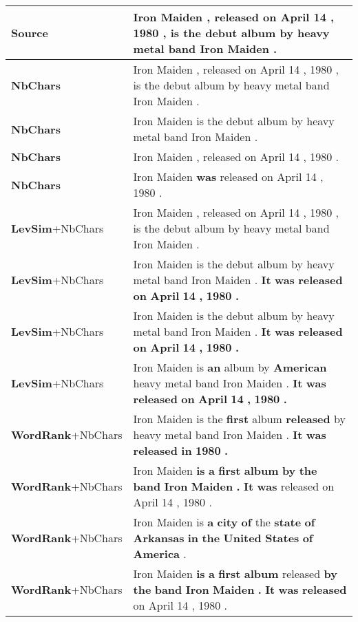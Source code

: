 \documentclass[10pt, a4paper]{article}
\begin{document}
\begin{table*}
{\begin{tabular}{ll}
\textbf{Source} & Iron Maiden , released on April 14 , 1980 , is the debut album by heavy metal band Iron Maiden . \\
\midrule
\textbf{NbChars} & Iron Maiden , released on April 14 , 1980 , is the debut album by heavy metal band Iron Maiden . \\
\textbf{NbChars} & Iron Maiden is the debut album by heavy metal band Iron Maiden . \\
\textbf{NbChars} & Iron Maiden , released on April 14 , 1980 . \\
\textbf{NbChars} & Iron Maiden \textbf{was} released on April 14 , 1980 . \\
\midrule
\textbf{LevSim}\footnotesize{+NbChars} & Iron Maiden , released on April 14 , 1980 , is the debut album by heavy metal band Iron Maiden . \\
\textbf{LevSim}\footnotesize{+NbChars} & Iron Maiden is the debut album by heavy metal band Iron Maiden . \textbf{It} \textbf{was} \textbf{released} \textbf{on} \textbf{April} \textbf{14} \textbf{,} \textbf{1980} \textbf{.} \\
\textbf{LevSim}\footnotesize{+NbChars} & Iron Maiden is the debut album by heavy metal band Iron Maiden . \textbf{It} \textbf{was} \textbf{released} \textbf{on} \textbf{April} \textbf{14} \textbf{,} \textbf{1980} \textbf{.} \\
\textbf{LevSim}\footnotesize{+NbChars} & Iron Maiden is \textbf{an} album by \textbf{American} heavy metal band Iron Maiden . \textbf{It} \textbf{was} \textbf{released} \textbf{on} \textbf{April} \textbf{14} \textbf{,} \textbf{1980} \textbf{.} \\
\midrule
\textbf{WordRank}\footnotesize{+NbChars} & Iron Maiden is the \textbf{first} album \textbf{released} by heavy metal band Iron Maiden . \textbf{It} \textbf{was} \textbf{released} \textbf{in} \textbf{1980} \textbf{.} \\
\textbf{WordRank}\footnotesize{+NbChars} & Iron Maiden \textbf{is} \textbf{a} \textbf{first} \textbf{album} \textbf{by} \textbf{the} \textbf{band} \textbf{Iron} \textbf{Maiden} \textbf{.} \textbf{It} \textbf{was} released on April 14 , 1980 . \\
\textbf{WordRank}\footnotesize{+NbChars} & Iron Maiden is \textbf{a} \textbf{city} \textbf{of} the \textbf{state} \textbf{of} \textbf{Arkansas} \textbf{in} \textbf{the} \textbf{United} \textbf{States} \textbf{of} \textbf{America} . \\
\textbf{WordRank}\footnotesize{+NbChars} & Iron Maiden \textbf{is} \textbf{a} \textbf{first} \textbf{album} released \textbf{by} \textbf{the} \textbf{band} \textbf{Iron} \textbf{Maiden} \textbf{.} \textbf{It} \textbf{was} \textbf{released} on April 14 , 1980 . \\

\end{tabular}}
\end{table*}
\end{document}
